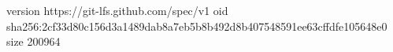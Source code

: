 version https://git-lfs.github.com/spec/v1
oid sha256:2cf33d80c156d3a1489dab8a7eb5b8b492d8b407548591ee63cffdfe105648e0
size 200964
